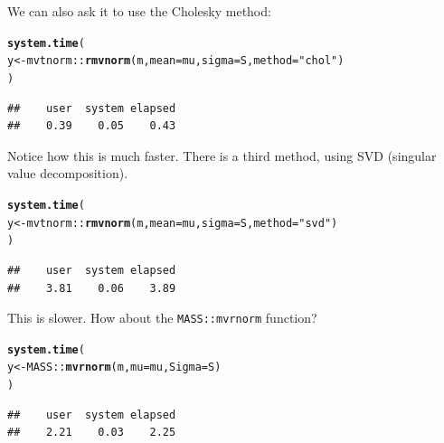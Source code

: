 \documentclass[a4paper, 11pt, amsmath]{article}\usepackage[]{graphicx}\usepackage[]{color}
\makeatletter
\newcommand{\hlstr}[1]{\textcolor[rgb]{0.192,0.494,0.8}{#1}}%
\newcommand{\hlopt}[1]{\textcolor[rgb]{0,0,0}{#1}}%
\newcommand{\hlstd}[1]{\textcolor[rgb]{0.345,0.345,0.345}{#1}}%
\newcommand{\hlkwb}[1]{\textcolor[rgb]{0.69,0.353,0.396}{#1}}%
\newcommand{\hlkwc}[1]{\textcolor[rgb]{0.333,0.667,0.333}{#1}}%
\newcommand{\hlkwd}[1]{\textcolor[rgb]{0.737,0.353,0.396}{\textbf{#1}}}%
\newenvironment{kframe}{%
 \def\at@end@of@kframe{}%
 \ifinner\ifhmode%
  \def\at@end@of@kframe{\end{minipage}}%
  \begin{minipage}{\columnwidth}%
 \fi\fi%
 \def\FrameCommand##1{\hskip\@totalleftmargin \hskip-\fboxsep
 \colorbox{shadecolor}{##1}\hskip-\fboxsep
     \hskip-\linewidth \hskip-\@totalleftmargin \hskip\columnwidth}%
 \MakeFramed {\advance\hsize-\width
   \@totalleftmargin\z@ \linewidth\hsize
   \@setminipage}}%
 {\par\unskip\endMakeFramed%
 \at@end@of@kframe}
\newenvironment{knitrout}{}{} %
\makeatother
\begin{document}
We can also ask it to use the Cholesky method:

\begin{knitrout}
\color{fgcolor}\begin{kframe}
\begin{alltt}
\hlkwd{system.time}\hlstd{(}
  \hlstd{y} \hlkwb{<-} \hlstd{mvtnorm}\hlopt{::}\hlkwd{rmvnorm}\hlstd{(m,} \hlkwc{mean} \hlstd{= mu,} \hlkwc{sigma} \hlstd{= S,} \hlkwc{method} \hlstd{=} \hlstr{"chol"}\hlstd{)}
  \hlstd{)}
\end{alltt}
\begin{verbatim}
##    user  system elapsed 
##    0.39    0.05    0.43
\end{verbatim}
\end{kframe}
\end{knitrout}

Notice how this is much faster. There is a third method, using SVD (singular value decomposition).

\begin{knitrout}
\color{fgcolor}\begin{kframe}
\begin{alltt}
\hlkwd{system.time}\hlstd{(}
  \hlstd{y} \hlkwb{<-} \hlstd{mvtnorm}\hlopt{::}\hlkwd{rmvnorm}\hlstd{(m,} \hlkwc{mean} \hlstd{= mu,} \hlkwc{sigma} \hlstd{= S,} \hlkwc{method} \hlstd{=} \hlstr{"svd"}\hlstd{)}
  \hlstd{)}
\end{alltt}
\begin{verbatim}
##    user  system elapsed 
##    3.81    0.06    3.89
\end{verbatim}
\end{kframe}
\end{knitrout}

This is slower. How about the {\tt MASS::mvrnorm} function?

\begin{knitrout}
\color{fgcolor}\begin{kframe}
\begin{alltt}
\hlkwd{system.time}\hlstd{(}
  \hlstd{y} \hlkwb{<-} \hlstd{MASS}\hlopt{::}\hlkwd{mvrnorm}\hlstd{(m,} \hlkwc{mu} \hlstd{= mu,} \hlkwc{Sigma} \hlstd{= S)}
  \hlstd{)}
\end{alltt}
\begin{verbatim}
##    user  system elapsed 
##    2.21    0.03    2.25
\end{verbatim}
\end{kframe}
\end{knitrout}
\end{document}
